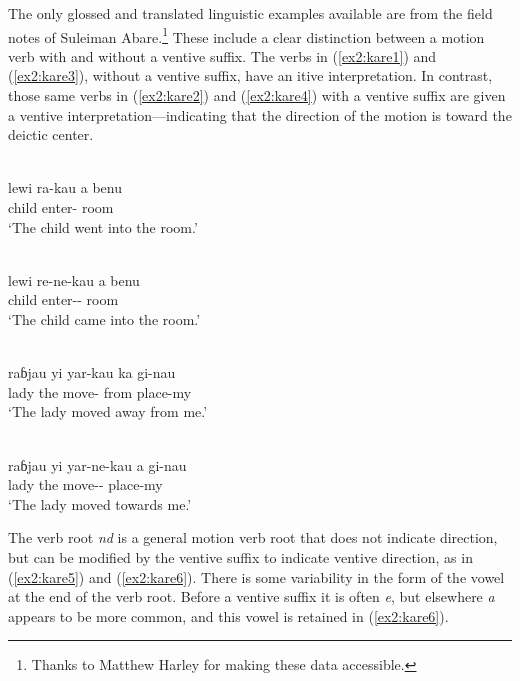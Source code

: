 The only glossed and translated linguistic examples available are from the field notes of Suleiman Abare.\footnote{Thanks to Matthew Harley for making these data accessible.} These include a clear distinction between a motion verb with and without a ventive suffix. The verbs in (\ref{ex2:kare1}) and (\ref{ex2:kare3}), without a ventive suffix, have an itive interpretation. In contrast, those same verbs in (\ref{ex2:kare2}) and (\ref{ex2:kare4}) with a ventive suffix are given a ventive interpretation---indicating that the direction of the motion is toward the deictic center.

\ea \label{ex2:kare1}
 \\
\gll lewi ra-kau a benu	\\
child enter-  room	\\
\glt `The child went into the room.'

\ex\label{ex2:kare2}
 \\
\gll lewi re-ne-kau a benu \\
child enter--  room	\\
\glt `The child came into the room.'

\ex\label{ex2:kare3}
 \\
\gll raɓjau yi yar-kau ka gi-nau \\
lady the move- from place-my	\\	
\glt `The lady moved away from me.'

\ex\label{ex2:kare4}
 \\
\gll raɓjau yi yar-ne-kau a gi-nau	\\
lady the move--  place-my	\\
\glt `The lady moved towards me.'
\z 

The verb root \textit{nd} is a general motion verb root that does not indicate direction, but can be modified by the ventive suffix to indicate ventive direction, as in (\ref{ex2:kare5}) and (\ref{ex2:kare6}). There is some variability in the form of the vowel at the end of the verb root. Before a ventive suffix it is often \textit{e}, but elsewhere \textit{a} appears to be more common, and this vowel is retained in (\ref{ex2:kare6}).  


